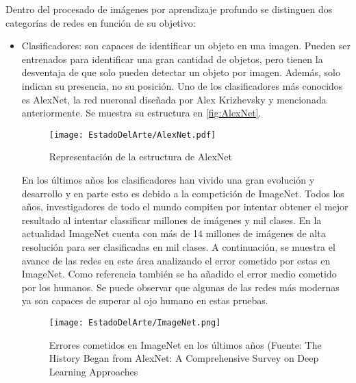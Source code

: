 Dentro del procesado de imágenes por aprendizaje profundo se distinguen dos categorías de redes en función de su objetivo:
\begin{itemize}
\item Clasificadores: son capaces de identificar un objeto en una imagen. Pueden ser entrenados para identificar una gran cantidad de objetos, pero tienen la desventaja de que solo pueden detectar un objeto por imagen. Además, solo indican su presencia, no su posición. Uno de los clasificadores más conocidos es AlexNet, la red nueronal diseñada por Alex Krizhevsky y mencionada anteriormente. Se muestra su estructura en \autoref{fig:AlexNet}.

\begin{figure}[ht]
	\centering
	\texttt{[image: EstadoDelArte/AlexNet.pdf]}
	\caption[Estructura de AlexNet]{Representación de la estructura de AlexNet \cite{AlexNet}}
	\label{fig:AlexNet}
	\vspace{-5pt}
\end{figure}

En los últimos años los clasificadores han vivido una gran evolución y desarrollo y en parte esto es debido a la competición de ImageNet. Todos los años, investigadores de todo el mundo compiten por intentar obtener el mejor resultado al intentar classificar millones de imágenes y mil clases. En la actualidad ImageNet cuenta con más de 14 millones de imágenes de alta resolución para ser clasificadas en mil clases. A continuación, se muestra el avance de las redes en este área analizando el error cometido por estas en ImageNet. Como referencia también se ha añadido el error medio cometido por los humanos. Se puede observar que algunas de las redes más modernas ya son capaces de superar al ojo humano en estas pruebas.

\begin{figure}[ht]
	\centering
	\texttt{[image: EstadoDelArte/ImageNet.png]}
	\caption[Errores cometidos en ImageNet en los últimos años]{Errores cometidos en ImageNet en los últimos años (Fuente: The History Began from AlexNet: A Comprehensive Survey on Deep Learning Approaches \cite{alom2018history}}
	\label{fig:ImageNet}
	\vspace{-5pt}
\end{figure}



\end{itemize}
